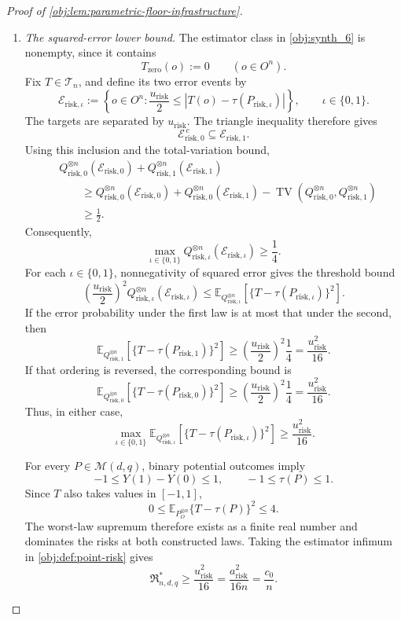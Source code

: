\begin{proof}[Proof of \cref{obj:lem:parametric-floor-infrastructure}]
\begin{enumerate}
\item \emph{The squared-error lower bound.}
The estimator class in \cref{obj:synth_6} is nonempty, since it contains
\[
T_{\mathrm{zero}}(o):=0
\qquad(o\in O^n).
\]
Fix \(T\in\mathcal T_n\), and define its two error events by
\[
\mathcal E_{\mathrm{risk},\iota}
:=
\left\{
o\in O^n:
\frac{u_{\mathrm{risk}}}{2}
\le
\left|T(o)-\tau(P_{\mathrm{risk},\iota})\right|
\right\},
\qquad \iota\in\{0,1\}.
\]
The targets are separated by \(u_{\mathrm{risk}}\). The triangle inequality therefore gives
\[
\mathcal E_{\mathrm{risk},0}^{\,c}
\subseteq \mathcal E_{\mathrm{risk},1}.
\]
Using this inclusion and the total-variation bound,
\[
\begin{aligned}
&Q_{\mathrm{risk},0}^{\otimes n}(\mathcal E_{\mathrm{risk},0})
+
Q_{\mathrm{risk},1}^{\otimes n}(\mathcal E_{\mathrm{risk},1})\\
&\qquad\ge
Q_{\mathrm{risk},0}^{\otimes n}(\mathcal E_{\mathrm{risk},0})
+
Q_{\mathrm{risk},0}^{\otimes n}(\mathcal E_{\mathrm{risk},1})
-
\operatorname{TV}
 (Q_{\mathrm{risk},0}^{\otimes n},Q_{\mathrm{risk},1}^{\otimes n})\\
&\qquad\ge\frac12.
\end{aligned}
\]
Consequently,
\[
\max_{\iota\in\{0,1\}}
Q_{\mathrm{risk},\iota}^{\otimes n}(\mathcal E_{\mathrm{risk},\iota})
\ge\frac14.
\]
For each \(\iota\in\{0,1\}\), nonnegativity of squared error gives the threshold bound
\[
\left(\frac{u_{\mathrm{risk}}}{2}\right)^2
Q_{\mathrm{risk},\iota}^{\otimes n}(\mathcal E_{\mathrm{risk},\iota})
\le
\mathbb E_{Q_{\mathrm{risk},\iota}^{\otimes n}}
\left[
\{T-\tau(P_{\mathrm{risk},\iota})\}^2
\right].
\]
If the error probability under the first law is at most that under the second, then
\[
\mathbb E_{Q_{\mathrm{risk},1}^{\otimes n}}
\left[
\{T-\tau(P_{\mathrm{risk},1})\}^2
\right]
\ge
\left(\frac{u_{\mathrm{risk}}}{2}\right)^2\frac14
=
\frac{u_{\mathrm{risk}}^2}{16}.
\]
If that ordering is reversed, the corresponding bound is
\[
\mathbb E_{Q_{\mathrm{risk},0}^{\otimes n}}
\left[
\{T-\tau(P_{\mathrm{risk},0})\}^2
\right]
\ge
\left(\frac{u_{\mathrm{risk}}}{2}\right)^2\frac14
=
\frac{u_{\mathrm{risk}}^2}{16}.
\]
Thus, in either case,
\[
\max_{\iota\in\{0,1\}}
\mathbb E_{Q_{\mathrm{risk},\iota}^{\otimes n}}
\left[
\{T-\tau(P_{\mathrm{risk},\iota})\}^2
\right]
\ge\frac{u_{\mathrm{risk}}^2}{16}.
\]

For every \(P\in\mathcal M(d,q)\), binary potential outcomes imply
\[
-1\le Y(1)-Y(0)\le1,
\qquad
-1\le\tau(P)\le1.
\]
Since \(T\) also takes values in \([-1,1]\),
\[
0\le
\mathbb E_{P_O^{\otimes n}}\{T-\tau(P)\}^2
\le4.
\]
The worst-law supremum therefore exists as a finite real number and dominates the risks at both constructed laws. Taking the estimator infimum in \cref{obj:def:point-risk} gives
\[
\mathfrak R^*_{n,d,q}
\ge\frac{u_{\mathrm{risk}}^2}{16}
=
\frac{a_{\mathrm{risk}}^2}{16n}
=
\frac{c_0}{n}.
\]


\end{enumerate}
\end{proof}
